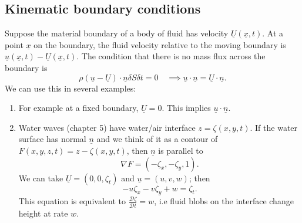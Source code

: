 \documentclass[a4paper]{scrartcl}
\renewcommand{\vec}[1]{\underline{#1}}
\begin{document}
\subsection{Kinematic boundary conditions}
Suppose the material boundary of a body of fluid has velocity $\vec{U} (\vec{x},t)$. At a point $\vec{x}$ on the boundary, the fluid velocity relative to the moving boundary is $\vec{u} (\vec{x},t)-\vec{U} (\vec{x}, t)$. The condition that there is no mass flux across the boundary is \[
\rho (\vec{u}-\vec{U})\cdot \vec{n} \delta S \delta t=0 \quad \implies \vec{u}\cdot \vec{n}=\vec{U}\cdot \vec{n}
.\] We can use this in several examples: 
\begin{enumerate}
    \item For example at a fixed boundary, $\vec{U}=0$. This implies $\vec{u} \cdot \vec{n}$.
    \item Water waves (chapter 5) have water/air interface $z=\zeta (x,y,t)$. If the water surface has normal $\vec{n}$ and we think of it as a contour of $F (x,y,z,t)=z- \zeta (x,y,t)$, then $\vec{n}$ is parallel to \[
    \nabla F= (-\zeta_{x},-\zeta_{y}, 1 )
    .\] We can take $\vec{U}=(0,0,\zeta_{t})$ and $\vec{u}=(u,v,w)$; then \[
    -u \zeta_{x}-v \zeta_{y}+w= \zeta_{t}
    .\] This equation is equivalent to $ \frac{\mathcal{D}\zeta}{\mathcal{D}t}=w$, i.e fluid blobs on the interface change height at rate $w$. 
\end{enumerate}
\end{document}
